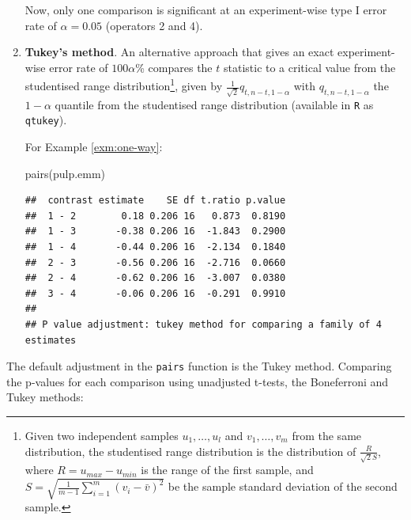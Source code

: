 \documentclass[
]{book}
\newenvironment{Shaded}{\begin{snugshade}}{\end{snugshade}}
\newcommand{\FunctionTok}[1]{\textcolor[rgb]{0.00,0.00,0.00}{#1}}
\newcommand{\NormalTok}[1]{#1}
\theoremstyle{definition}
\theoremstyle{definition}
\theoremstyle{definition}
\theoremstyle{definition}
\theoremstyle{remark}
\begin{document}
\begin{enumerate}
  Now, only one comparison is significant at an experiment-wise type I error rate of \(\alpha = 0.05\) (operators 2 and 4).
\item
  \textbf{Tukey's method}. An alternative approach that gives an exact experiment-wise error rate of \(100\alpha\)\% compares the \(t\) statistic to a critical value from the studentised range distribution\footnote{Given two independent samples \(u_1, \ldots, u_l\) and \(v_1,\ldots,v_m\) from the same distribution, the studentised range distribution is the distribution of \(\frac{R}{\sqrt{2}S}\), where \(R = u_{max}-u_{min}\) is the range of the first sample, and \(S = \sqrt{\frac{1}{m-1}\sum_{i=1}^m(v_i - \bar{v})^2}\) be the sample standard deviation of the second sample.}, given by \(\frac{1}{\sqrt{2}}q_{t, n-t, 1-\alpha}\) with \(q_{t, n-t, 1-\alpha}\) the \(1-\alpha\) quantile from the studentised range distribution (available in \texttt{R} as \texttt{qtukey}).

  For Example \ref{exm:one-way}:

\begin{Shaded}
\begin{Highlighting}[]
\FunctionTok{pairs}\NormalTok{(pulp.emm)}
\end{Highlighting}
\end{Shaded}

\begin{verbatim}
##  contrast estimate    SE df t.ratio p.value
##  1 - 2        0.18 0.206 16   0.873  0.8190
##  1 - 3       -0.38 0.206 16  -1.843  0.2900
##  1 - 4       -0.44 0.206 16  -2.134  0.1840
##  2 - 3       -0.56 0.206 16  -2.716  0.0660
##  2 - 4       -0.62 0.206 16  -3.007  0.0380
##  3 - 4       -0.06 0.206 16  -0.291  0.9910
## 
## P value adjustment: tukey method for comparing a family of 4 estimates
\end{verbatim}
\end{enumerate}

The default adjustment in the \texttt{pairs} function is the Tukey method. Comparing the p-values for each comparison using unadjusted t-tests, the Boneferroni and Tukey methods:
\end{document}
